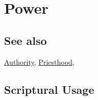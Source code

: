 \section{Power}
	\label{POWER}
	
\subsection{See also}

	\hyperref[AUTHORITY]{Authority}, \hyperref[PRIESTHOOD]{Priesthood}, 




	


\subsection{Scriptural Usage} %
	\label{POWER-SCRIPTURES}

